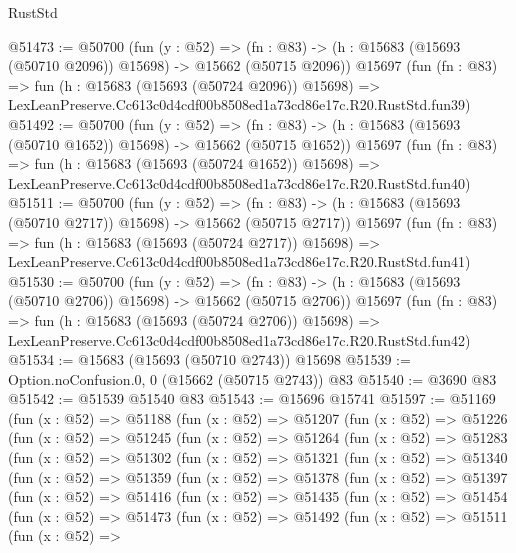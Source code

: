 \begin{lexlean}{RustStd}
\begin{coremodule}
@51473 := @50700
    (fun (y : @52) =>
    (fn : @83) -> (h : @15683 (@15693 (@50710 @2096)) @15698) -> @15662 (@50715 @2096))
    @15697
    (fun (fn : @83) =>
    fun (h : @15683 (@15693 (@50724 @2096)) @15698) =>
    LexLeanPreserve.Cc613c0d4cdf00b8508ed1a73cd86e17c.R20.RustStd.fun39)
@51492 := @50700
    (fun (y : @52) =>
    (fn : @83) -> (h : @15683 (@15693 (@50710 @1652)) @15698) -> @15662 (@50715 @1652))
    @15697
    (fun (fn : @83) =>
    fun (h : @15683 (@15693 (@50724 @1652)) @15698) =>
    LexLeanPreserve.Cc613c0d4cdf00b8508ed1a73cd86e17c.R20.RustStd.fun40)
@51511 := @50700
    (fun (y : @52) =>
    (fn : @83) -> (h : @15683 (@15693 (@50710 @2717)) @15698) -> @15662 (@50715 @2717))
    @15697
    (fun (fn : @83) =>
    fun (h : @15683 (@15693 (@50724 @2717)) @15698) =>
    LexLeanPreserve.Cc613c0d4cdf00b8508ed1a73cd86e17c.R20.RustStd.fun41)
@51530 := @50700
    (fun (y : @52) =>
    (fn : @83) -> (h : @15683 (@15693 (@50710 @2706)) @15698) -> @15662 (@50715 @2706))
    @15697
    (fun (fn : @83) =>
    fun (h : @15683 (@15693 (@50724 @2706)) @15698) =>
    LexLeanPreserve.Cc613c0d4cdf00b8508ed1a73cd86e17c.R20.RustStd.fun42)
@51534 := @15683 (@15693 (@50710 @2743)) @15698
@51539 := Option.noConfusion.{0, 0} (@15662 (@50715 @2743)) @83
@51540 := @3690 @83
@51542 := @51539 @51540 @83
@51543 := @15696 @15741
@51597 := @51169
    (fun (x : @52) =>
    @51188
      (fun (x : @52) =>
      @51207
        (fun (x : @52) =>
        @51226
          (fun (x : @52) =>
          @51245
            (fun (x : @52) =>
            @51264
              (fun (x : @52) =>
              @51283
                (fun (x : @52) =>
                @51302
                  (fun (x : @52) =>
                  @51321
                    (fun (x : @52) =>
                    @51340
                      (fun (x : @52) =>
                      @51359
                        (fun (x : @52) =>
                        @51378
                          (fun (x : @52) =>
                          @51397
                            (fun (x : @52) =>
                            @51416
                              (fun (x : @52) =>
                              @51435
                                (fun (x : @52) =>
                                @51454
                                  (fun (x : @52) =>
                                  @51473
                                    (fun (x : @52) =>
                                    @51492
                                      (fun (x : @52) =>
                                      @51511
                                        (fun (x : @52) =>

\end{coremodule}
\end{lexlean}
